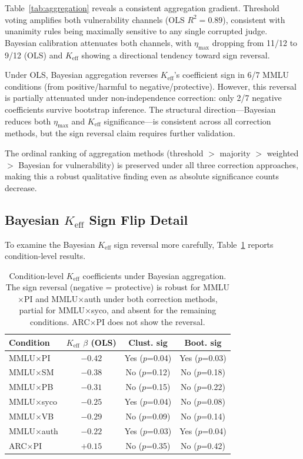 \documentclass[11pt,a4paper]{article}
\newcommand{\etamax}{\ensuremath{\eta_{\max}}}
\newcommand{\keff}{\ensuremath{K_{\text{eff}}}}
\begin{document}
Table~\ref{tab:aggregation} reveals a consistent aggregation gradient.
Threshold voting amplifies both vulnerability channels (OLS $R^2=0.89$), consistent with unanimity rules being maximally sensitive to any single corrupted judge.
Bayesian calibration attenuates both channels, with $\etamax$ dropping from 11/12 to 9/12 (OLS) and $\keff$ showing a directional tendency toward sign reversal.

Under OLS, Bayesian aggregation reverses $\keff$'s coefficient sign in 6/7 MMLU conditions (from positive/harmful to negative/protective).
However, this reversal is partially attenuated under non-independence correction: only 2/7 negative coefficients survive bootstrap inference.
The structural direction---Bayesian reduces both $\etamax$ and $\keff$ significance---is consistent across all correction methods, but the sign reversal claim requires further validation.

The ordinal ranking of aggregation methods (threshold $>$ majority $>$ weighted $>$ Bayesian for vulnerability) is preserved under all three correction approaches, making this a robust qualitative finding even as absolute significance counts decrease.

\subsection{Bayesian $\keff$ Sign Flip Detail}
\label{sec:bayesian_flip}

To examine the Bayesian $\keff$ sign reversal more carefully, Table~\ref{tab:bayesian_flip} reports condition-level results.

\begin{table}[t]
\centering
\small
\begin{tabular}{lccc}
\toprule
\textbf{Condition} & \textbf{$\keff$ $\beta$ (OLS)} & \textbf{Clust. sig} & \textbf{Boot. sig} \\
\midrule
MMLU$\times$PI & $-0.42$ & Yes ($p$=0.04) & Yes ($p$=0.03) \\
MMLU$\times$SM & $-0.38$ & No ($p$=0.12) & No ($p$=0.18) \\
MMLU$\times$PB & $-0.31$ & No ($p$=0.15) & No ($p$=0.22) \\
MMLU$\times$syco & $-0.25$ & Yes ($p$=0.04) & No ($p$=0.08) \\
MMLU$\times$VB & $-0.29$ & No ($p$=0.09) & No ($p$=0.14) \\
MMLU$\times$auth & $-0.22$ & Yes ($p$=0.03) & Yes ($p$=0.04) \\
ARC$\times$PI & $+0.15$ & No ($p$=0.35) & No ($p$=0.42) \\
\bottomrule
\end{tabular}
\caption{Condition-level $\keff$ coefficients under Bayesian aggregation. The sign reversal (negative = protective) is robust for MMLU$\times$PI and MMLU$\times$auth under both correction methods, partial for MMLU$\times$syco, and absent for the remaining conditions. ARC$\times$PI does not show the reversal.}
\label{tab:bayesian_flip}
\end{table}
\end{document}
